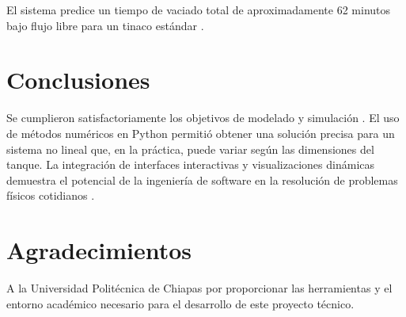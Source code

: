 \documentclass{cys}
\begin{document}
	El sistema predice un tiempo de vaciado total de aproximadamente 62 minutos bajo flujo libre para un tinaco estándar \cite{upchiapas2026}.
	
	\section{Conclusiones}
	\label{sec:conclusion}
	Se cumplieron satisfactoriamente los objetivos de modelado y simulación \cite{guiaProyecto2026}. El uso de métodos numéricos en Python permitió obtener una solución precisa para un sistema no lineal que, en la práctica, puede variar según las dimensiones del tanque. La integración de interfaces interactivas y visualizaciones dinámicas demuestra el potencial de la ingeniería de software en la resolución de problemas físicos cotidianos \cite{upchiapas2026}.
	
	\section*{Agradecimientos}
	A la Universidad Politécnica de Chiapas por proporcionar las herramientas y el entorno académico necesario para el desarrollo de este proyecto técnico.
	
	\small{
		
		
	}
	\normalsize
	
	\begin{biography}[]{} 
	\end{biography}
	
\end{document}
